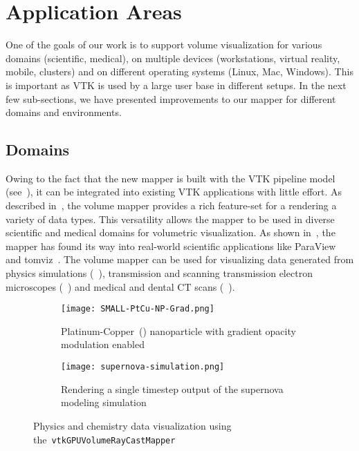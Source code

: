 \section{Application Areas}
\label{applicationareas}

One of the goals of our work is to support volume visualization for various
domains (scientific, medical), on multiple devices (workstations, virtual
reality, mobile, clusters) and on different operating systems (Linux, Mac,
Windows). This is important as VTK is used by a large user base in different
setups.  In the next few sub-sections, we have presented improvements to our
mapper for different domains and environments.

\subsection{Domains}
\label{domains}

Owing to the fact that the new mapper is built with the VTK pipeline model
(see~), it can be integrated into existing VTK
applications with little effort. As described
in~, the volume mapper provides a rich
feature-set for a rendering a variety of data types. This versatility allows the
mapper to be used in diverse scientific and medical domains for volumetric
visualization. As shown in~, the mapper has found its way into real-world scientific
applications like ParaView~\citep{ahrens_paraview:_2005, ayachit_paraview_2015,
ayachit_paraview_2015-1} and tomviz~\citep{hanwell_tomviz_2014}. The volume
mapper can be used for
visualizing data generated from physics simulations (~),
transmission and scanning transmission electron microscopes
(~) and medical and dental CT scans
(~). 

\begin{figure}[ht]
  \begin{subfigure}[b]{0.49\columnwidth}
    \texttt{[image: SMALL-PtCu-NP-Grad.png]}
    \caption{Platinum-Copper~()
      nanoparticle \protect\citep{scott_electron_2012, miao_atomic_2016} with
      gradient opacity modulation enabled}
    \label{fig:ptcu-grad}
  \end{subfigure}\hfill%
  \begin{subfigure}[b]{0.49\columnwidth}
    \texttt{[image: supernova-simulation.png]}
    \caption{Rendering a single timestep output of the supernova modeling
      simulation~\protect\citep{blondin_pulsar_2007}}
    \label{fig:supernova}
  \end{subfigure}
  \caption{Physics and chemistry data visualization using
    the~\texttt{vtkGPUVolumeRayCastMapper}}
  \label{fig:domains}
\end{figure}

